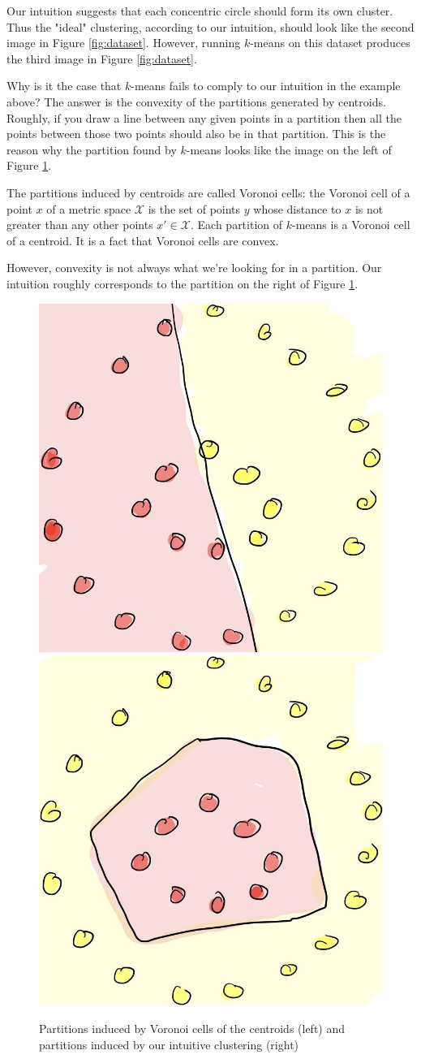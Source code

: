 Our intuition suggests that each concentric circle should form its own cluster.
Thus the "ideal" clustering, according to our intuition, should look like the
second image in Figure \ref{fig:dataset}. However, running $k$-means on this dataset
produces the third image in Figure \ref{fig:dataset}.

Why is it the case that $k$-means fails to comply to our intuition in the example
above? The answer is the convexity of the partitions generated by centroids. Roughly,
if you draw a line between any given points in a partition then all the points
between those two points should also be in that partition. This is the reason
why the partition found by $k$-means looks like the image on the left of
Figure \ref{fig:partition}.

The partitions induced by centroids are called Voronoi cells: the Voronoi
cell of a point $x$ of a metric space $\mathcal{X}$ is the set of points
$y$ whose distance to $x$ is not greater than any other points $x' \in \mathcal{X}$.
Each partition of $k$-means is a Voronoi cell of a centroid. It is a fact that
Voronoi cells are convex.

However, convexity is not always what we're looking for in a partition. Our intuition
roughly corresponds to the partition on the right of  Figure \ref{fig:partition}.

\begin{figure}[h!]
\begin{center}
\includegraphics[width=.49\linewidth]{chapter_2/files/voronoi-cell.jpg}
\includegraphics[width=.49\linewidth]{chapter_2/files/intuition-cell.jpg}
\end{center}
\caption{Partitions induced by Voronoi cells of the centroids (left) and
partitions induced by our intuitive clustering (right)}
\label{fig:partition}
\end{figure}


